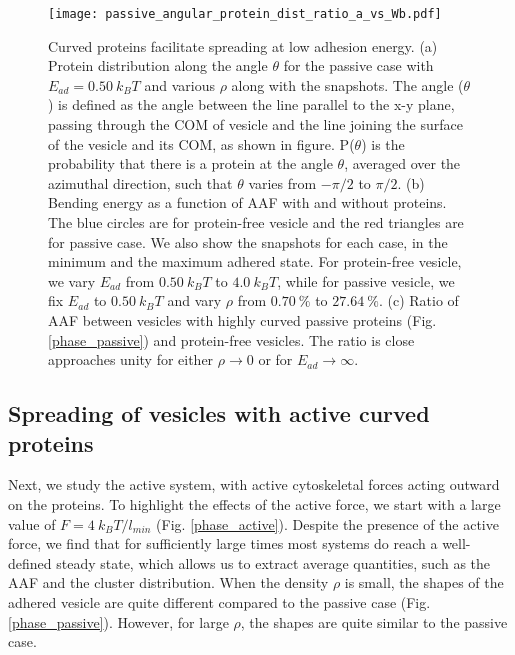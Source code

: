 \documentclass[pre,amsmath]{revtex4}
\begin{document}
\begin{figure}[ht]
\centering
\texttt{[image: passive\_angular\_protein\_dist\_ratio\_a\_vs\_Wb.pdf]}
\caption{Curved proteins facilitate spreading at low adhesion energy. (a) Protein distribution along the angle $\theta$ for the passive case with $E_{ad}=0.50 ~k_B T$ and various $\rho$ along with the snapshots. The angle ($\theta$) is defined as the angle between the line parallel to the x-y plane, passing through the COM of vesicle and the line joining the surface of the vesicle and its COM, as shown in figure. P($\theta$) is the probability that there is a protein at the angle $\theta$, averaged over the azimuthal direction, such that $\theta$ varies from $-\pi/2$ to $\pi/2$.  (b) Bending energy as a function of AAF with and without proteins. The blue circles are for protein-free vesicle and the red triangles are for passive case. We also show the snapshots for each case, in the minimum and the maximum adhered state. For protein-free vesicle, we vary $E_{ad}$ from $0.50 ~k_B T$ to $4.0~ k_B T$, while for passive vesicle, we fix $E_{ad}$ to $0.50 ~k_B T$ and vary $\rho$ from $0.70 ~\%$ to $27.64 ~\%$.  (c) Ratio of AAF between vesicles with highly curved passive proteins (Fig.\ref{phase_passive}) and protein-free vesicles. The ratio is close approaches unity for either $\rho\rightarrow 0$ or for $E_{ad}\rightarrow\infty$.}
\label{passive_cluster} 
\end{figure}

\subsection{Spreading of vesicles with active curved proteins}
Next, we study the active system, with active cytoskeletal forces acting outward on the proteins. To highlight the effects of the active force, we start with a large value of $F= 4 ~k_BT/l_{min}$ (Fig. \ref{phase_active}). Despite the presence of the active force, we find that for sufficiently large times most systems do reach a well-defined steady state, which allows us to extract average quantities, such as the AAF and the cluster distribution. When the density $\rho$ is small, the shapes of the adhered vesicle are quite different compared to the passive case (Fig. \ref{phase_passive}). However, for large $\rho$, the shapes are quite similar to the passive case. 
\end{document}
